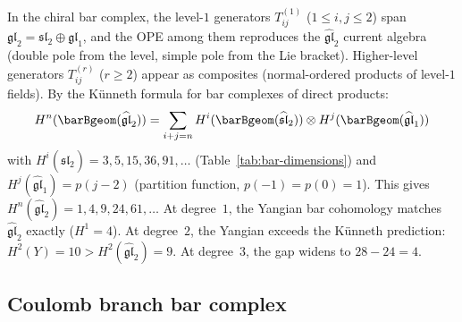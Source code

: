 \begin{remark}
\label{rem:yangian-gl2-kunneth}
In the chiral bar complex, the level-$1$ generators
$T_{ij}^{(1)}$ ($1 \leq i,j \leq 2$) span
$\mathfrak{gl}_2 = \mathfrak{sl}_2 \oplus \mathfrak{gl}_1$, and
the OPE among them reproduces the $\widehat{\mathfrak{gl}}_2$
current algebra (double pole from the level, simple pole from
the Lie bracket).  Higher-level generators $T_{ij}^{(r)}$
($r \geq 2$) appear as composites
(normal-ordered products of level-$1$ fields).
By the K\"unneth formula for bar complexes
of direct products:
\[
H^n(\barBgeom(\widehat{\mathfrak{gl}}_2))
= \sum_{i+j = n}
H^i(\barBgeom(\widehat{\mathfrak{sl}}_2))
\otimes
H^j(\barBgeom(\widehat{\mathfrak{gl}}_1))
\]
with $H^i(\widehat{\mathfrak{sl}}_2) = 3, 5, 15, 36, 91, \ldots$
(Table~\ref{tab:bar-dimensions}) and
$H^j(\widehat{\mathfrak{gl}}_1) = p(j{-}2)$ (partition function,
$p({-}1) = p(0) = 1$).  This gives
$H^n(\widehat{\mathfrak{gl}}_2) = 1, 4, 9, 24, 61, \ldots$
At degree~$1$, the Yangian bar cohomology matches
$\widehat{\mathfrak{gl}}_2$ exactly ($H^1 = 4$).
At degree~$2$, the Yangian exceeds the K\"unneth prediction:
$H^2(Y) = 10 > H^2(\widehat{\mathfrak{gl}}_2) = 9$.
At degree~$3$, the gap widens to $28 - 24 = 4$.
\end{remark}


\subsection{Coulomb branch bar complex}

